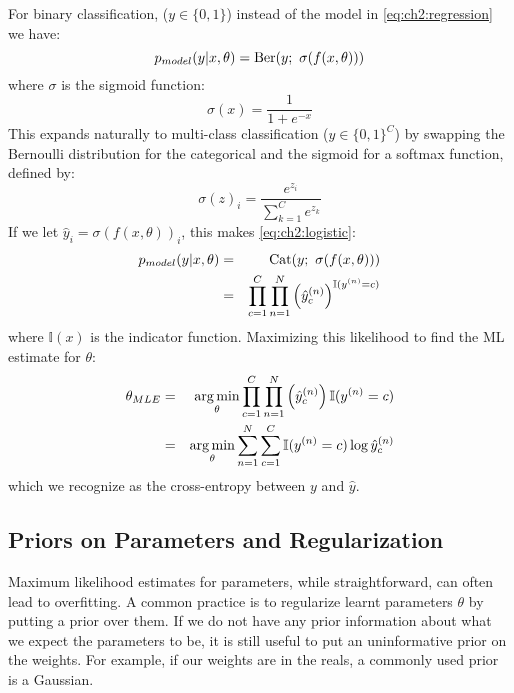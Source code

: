For binary classification, ($y \in \{0, 1\}$) instead of the model in
\eqref{eq:ch2:regression} we have: 
\begin{equation} \label{eq:ch2:logistic}
  p_{model}(y|x, \theta) = \mathrm{Ber}(y;\ \sigma(f(x, \theta)))
\end{equation}
where $\sigma$ is the sigmoid function:
\begin{equation}\label{eq:ch2:sigmoid}
  \sigma(x) = \frac{1}{1+e^{-x}}
\end{equation}
This expands naturally to multi-class classification ($y \in \{0, 1\}^C$) by
swapping the Bernoulli distribution for the categorical and the sigmoid for a
softmax function, defined by:
\begin{equation}
  \sigma(z)_i = \frac{e^{z_i}}{\sum_{k=1}^C e^{z_k}}
\end{equation}
If we let $\hat{y}_i = \sigma(f(x, \theta))_i$, this makes \eqref{eq:ch2:logistic}:
\begin{eqnarray}\label{eq:ch2:classification}
  p_{model}(y|x, \theta) &=& \mathrm{Cat}(y;\ \sigma(f(x, \theta))) \\
                         &=& \prod_{c=1}^C \prod_{n=1}^N \left(\hat{y}_c^{(n)}\right)^{\mathbb{I}(y^{(n)} = c)}
\end{eqnarray}
where $\mathbb{I}(x)$ is the indicator function. Maximizing this likelihood to
find the ML estimate for $\theta$:
\begin{eqnarray}
  \theta_{MLE} &=& \operatorname*{arg\,min}_\theta \prod_{c=1}^C \prod_{n=1}^N \left(\hat{y}_c^{(n)}\right){\mathbb{I}(y^{(n)} = c)} \\
               &=& \operatorname*{arg\,min}_\theta \sum_{n=1}^N \sum_{c=1}^C \mathbb{I}(y^{(n)} = c)\log \hat{y}_c^{(n)} 
\end{eqnarray}
which we recognize as the cross-entropy between $y$ and $\hat{y}$.

\subsection{Priors on Parameters and Regularization}
  Maximum likelihood estimates for parameters, while straightforward, can often
  lead to overfitting. A common practice is to regularize learnt parameters
  $\theta$ by putting a prior over them. If we do not have any prior information
  about what we expect the parameters to be, it is still useful to put an
  uninformative prior on the weights. For example, if our weights are in the
  reals, a commonly used prior is a Gaussian.

